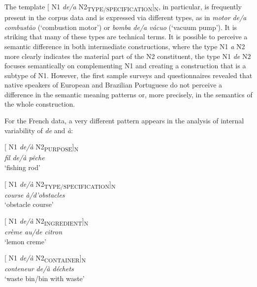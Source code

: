 \documentclass[output=paper]{langsci/langscibook}
\begin{document}
The template [ N1 \textit{de/a} N2\textsubscript{TYPE/SPECIFICATION}]\textsubscript{N}, in particular, is frequently present in the corpus data and is expressed via different types, as in \textit{motor de/a combustão} (`combustion motor') or \textit{bomba de/a vácuo} (`vacuum pump'). It is striking that many of these types are technical terms. It is possible to perceive a semantic difference in both intermediate constructions, where the type N1 \textit{a} N2 more clearly indicates the material part of the N2 constituent, the type N1 \textit{de} N2 focuses semantically on complementing N1 and creating a construction that is a subtype of N1. However, the first sample surveys and questionnaires revealed that native speakers of European and Brazilian Portuguese do not perceive a difference in the semantic meaning patterns or, more precisely, in the semantics of the whole construction.

For the French data, a very different pattern appears in the analysis of internal variability of \textit{de} and \textit{à}:\\  

\begin{exe}\ex\begin{minipage}[t]{0.4\textwidth}    %
[ N1 \textit{de/à} N2\textsubscript{PURPOSE}]\textsubscript{N}\\
\textit{fil de/à pêche}\\
`fishing rod'
\end{minipage}\hfill            %
\begin{minipage}[t]{0.45\textwidth}
[ N1 \textit{de/à} N2\textsubscript{TYPE/SPECIFICATION}]\textsubscript{N}\\
\textit{course à/d’obstacles}\\
`obstacle course'
\end{minipage}%
\end{exe}

\begin{exe}\ex\begin{minipage}[t]{0.4\textwidth}
[ N1 \textit{de/à} N2\textsubscript{INGREDIENT}]\textsubscript{N}\\
\textit{crème au/de citron}\\
`lemon creme'
\end{minipage}\hfill\begin{minipage}[t]{0.45\textwidth}
[ N1 \textit{de/à} N2\textsubscript{CONTAINER}]\textsubscript{N}\\
\textit{conteneur de/à déchets }\\
`waste bin\slash bin with waste'
\end{minipage}%
\end{exe}
\end{document}
